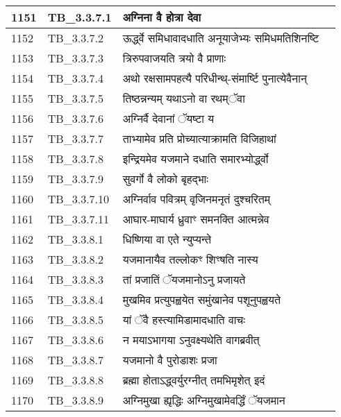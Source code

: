 \documentclass[17pt]{extarticle}
\begin{document}
\begin{longtable}{||p{0.4in}||p{0.9in}||p{4.0in}||p{0.9in}||}
        \hline
            1151 & TB\_3.3.7.1 & अग्निना वै होत्रा देवा &      \\
        \hline
            1152 & TB\_3.3.7.2 & ऊर्द्ध्वे समिधावादधाति अनूयाजेभ्यः समिधमतिशिनष्टि &      \\
        \hline
            1153 & TB\_3.3.7.3 & त्रिरुपवाजयति त्रयो वै प्राणाः &      \\
        \hline
            1154 & TB\_3.3.7.4 & अथो रक्षसामपहत्यै परिधीन्थ्{-}संमार्ष्टि पुनात्येवैनान् &      \\
        \hline
            1155 & TB\_3.3.7.5 & तिष्ठन्नन्यम् यथाऽनो वा रथम्ॅवा &      \\
        \hline
            1156 & TB\_3.3.7.6 & अग्निर्वै देवानां ॅयष्टा य &      \\
        \hline
            1157 & TB\_3.3.7.7 & ताभ्यामेव प्रति प्रोच्यात्याक्रामति विजिहाथां &      \\
        \hline
            1158 & TB\_3.3.7.8 & इन्द्रियमेव यजमाने दधाति समारभ्योर्द्ध्वो &      \\
        \hline
            1159 & TB\_3.3.7.9 & सुवर्गो वै लोको बृहद्भाः &      \\
        \hline
            1160 & TB\_3.3.7.10 & अग्निर्वाव पवित्रम् वृजिनमनृतं दुश्चरितम् &      \\
        \hline
            1161 & TB\_3.3.7.11 & आघार{-}माघार्य ध्रुवाꣳ समनक्ति आत्मन्नेव &      \\
        \hline
            1162 & TB\_3.3.8.1 & धिष्णिया वा एते न्युप्यन्ते &      \\
        \hline
            1163 & TB\_3.3.8.2 & यजमानायैव तल्लोकꣳ शिꣳषति नास्य &      \\
        \hline
            1164 & TB\_3.3.8.3 & तां प्रजातिं ॅयजमानोऽनु प्रजायते &      \\
        \hline
            1165 & TB\_3.3.8.4 & मुखमिव प्रत्युपह्वयेत समुंखानेव पशूनुपह्वयते &      \\
        \hline
            1166 & TB\_3.3.8.5 & यां ॅवै हस्त्यामिडामादधाति वाचः &      \\
        \hline
            1167 & TB\_3.3.8.6 & न मयाऽभागया ऽनुवक्ष्यथेति वागब्रवीत् &      \\
        \hline
            1168 & TB\_3.3.8.7 & यजमानो वै पुरोडाशः प्रजा &      \\
        \hline
            1169 & TB\_3.3.8.8 & ब्रह्मा होताऽद्ध्वर्युरग्नीत् तमभिमृशेत् इदं &      \\
        \hline
            1170 & TB\_3.3.8.9 & अग्निमुखा ह्यृद्धिः अग्निमुखामेवर्द्धिं ॅयजमान &      \\

\end{longtable}
\end{document}
